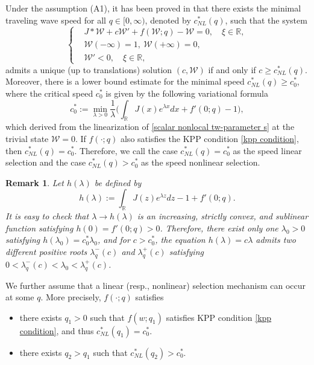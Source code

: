 \documentclass[11pt,a4paper]{article}
\newtheorem{remark}[theorem]{\textbf{Remark}}
\numberwithin{equation}{section}
\numberwithin{figure}{section}
\begin{document}
Under the assumption (A1), it has been proved in \cite{Coville} that there exists the minimal traveling wave speed for all $q\in[0,\infty)$, denoted by $c_{NL}^*(q)$, such that
the system
\begin{equation}\label{scalar nonlocal tw-parameter s}
\left\{
\begin{aligned}
&J\ast \mathcal{W}+c\mathcal{W}'+f(\mathcal{W};q)-\mathcal{W}=0,\quad  \xi\in\mathbb{R},\\
&\mathcal{W}(-\infty)=1,\ \mathcal{W}(+\infty)=0,\\
&\mathcal{W}'<0,\quad \xi\in\mathbb{R},
\end{aligned}
\right.
\end{equation}
admits a unique (up to translations) solution $(c,\mathcal{W})$ if and only if
$c\geq c_{NL}^*(q)$. %
Moreover, there is a lower bound estimate for the minimal speed $c_{NL}^*(q)\geq c_0^*$,
where the critical speed $c_0^*$ is given by the following variational formula
\begin{equation}\label{formula of c_NL}
c_{0}^*:=\min_{\lambda>0}\frac{1}{\lambda}\Big(\int_{\mathbb{R}}J(x)e^{\lambda x}dx+f'(0;q)-1\Big),
\end{equation}
which derived from the linearization of \eqref{scalar nonlocal tw-parameter s} at the trivial state $\mathcal{W}= 0$.
If $f(\cdot;q)$ also satisfies the KPP condition \eqref{kpp condition}, then
$c_{NL}^*(q)= c_0^*$. Therefore, we call the case $c_{NL}^*(q)= c_0^*$ as the speed linear selection and the case $c_{NL}^*(q)> c_0^*$ as the speed nonlinear selection.



\begin{remark}\label{rm:lambda_0}
Let $h(\lambda)$ be defined by
$$h(\lambda):=\int_{\mathbb{R}}J(z)e^{\lambda z}dz-1+f'(0;q).$$
It is easy to check that $\lambda\to h(\lambda)$ is an increasing, strictly convex, and sublinear function satisfying $h(0)=f'(0;q)>0$.
Therefore, there exist only one $\lambda_0>0$ satisfying $h(\lambda_0)=c_0^*\lambda_0$, and for $c>c_0^*$, the equation $h(\lambda)=c\lambda$ admits two different positive roots $\lambda_q^-(c)$ and $\lambda_q^+(c)$ satisfying $0<\lambda_q^-(c)<\lambda_0<\lambda_q^+(c)$. 
\end{remark}



We further assume that a linear (resp., nonlinear) selection mechanism can occur at some $q$.
More precisely, $f(\cdot;q)$ satisfies %
\begin{itemize}
    \item[(A6)] there exists $q_1>0$ such that $f(w;q_1)$ satisfies KPP condition \eqref{kpp condition},
   and thus $c_{NL}^*(q_1)=c^*_0$.
    \item[(A7)]  there exists  %
     $q_2>q_1$ such that $c_{NL}^*(q_2)>c^*_0$.
\end{itemize}
\end{document}
